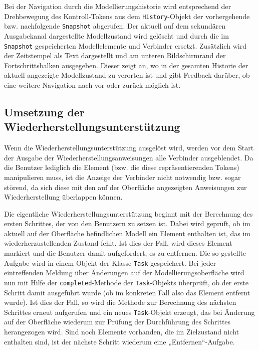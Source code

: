 Bei der Navigation durch die Modellierungshistorie wird entsprechend der Drehbewegung des Kontroll-Tokens aus dem \texttt{History}-Objekt der vorhergehende bzw. nachfolgende \texttt{Snapshot} abgerufen. Der aktuell auf dem sekundären Ausgabekanal dargestellte Modellzustand wird gelöscht und durch die im \texttt{Snapshot} gespeicherten Modellelemente und Verbinder ersetzt. Zusätzlich wird der Zeitstempel als Text dargestellt und am unteren Bildschirmrand der Fortschrittsbalken ausgegeben. Dieser zeigt an, wo in der gesamten Historie der aktuell angezeigte Modellzustand zu verorten ist und gibt Feedback darüber, ob eine weitere Navigation nach vor oder zurück möglich ist.


\subsection{Umsetzung der Wiederherstellungsunterstützung} %
\label{sub:umsetzung_der_wiederherstellungsunterstützung}

Wenn die Wiederherstellungsunterstützung ausgelöst wird, werden vor dem Start der Ausgabe der Wiederherstellungsanweisungen alle Verbinder ausgeblendet. Da die Benutzer lediglich die Element (bzw. die diese repräsentierenden Tokens) manipulieren muss, ist die Anzeige der Verbinder nicht notwendig bzw. sogar störend, da sich diese mit den auf der Oberfläche angezeigten Anweisungen zur Wiederherstellung überlappen können. 

Die eigentliche Wiederherstellungsunterstützung beginnt mit der Berechnung des ersten Schrittes, der von den Benutzern zu setzen ist. Dabei wird geprüft, ob im aktuell auf der Oberfläche befindlichen Modell ein Element enthalten ist, das im wiederherzustellenden Zustand fehlt. Ist dies der Fall, wird dieses Element markiert und die Benutzer damit aufgefordert, es zu entfernen. Die so gestellte Aufgabe wird in einem Objekt der Klasse \texttt{Task} gespeichert. Bei jeder eintreffenden Meldung über Änderungen auf der Modellierungsoberfläche wird nun mit Hilfe der \texttt{completed}-Methode der \texttt{Task}-Objekts überprüft, ob der erste Schritt damit ausgeführt wurde (ob im konkreten Fall also das Element entfernt wurde). Ist dies der Fall, so wird die Methode zur Berechnung des nächsten Schrittes erneut aufgerufen und ein neues \texttt{Task}-Objekt erzeugt, das bei Änderung auf der Oberfläche wiederum zur Prüfung der Durchführung des Schrittes herangezogen wird. Sind noch Elemente vorhanden, die im Zielzustand nicht enthalten sind, ist der nächste Schritt wiederum eine „Entfernen“-Aufgabe. 


